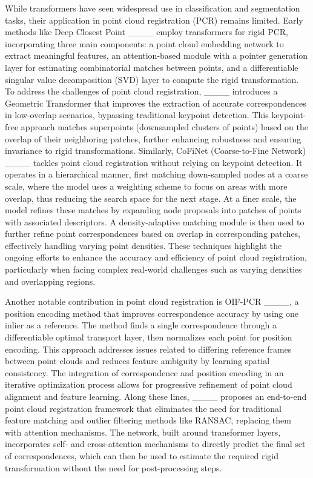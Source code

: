 While transformers have seen widespread use in classification and segmentation tasks, their application in point cloud registration (PCR) remains limited. Early methods like Deep Closest Point ____ employ transformers for rigid PCR, incorporating three main components: a point cloud embedding network to extract meaningful features, an attention-based module with a pointer generation layer for estimating combinatorial matches between points, and a differentiable singular value decomposition (SVD) layer to compute the rigid transformation. To address the challenges of point cloud registration, ____ introduces a Geometric Transformer that improves the extraction of accurate correspondences in low-overlap scenarios, bypassing traditional keypoint detection. This keypoint-free approach matches superpoints (downsampled clusters of points) based on the overlap of their neighboring patches, further enhancing robustness and ensuring invariance to rigid transformations. Similarly, CoFiNet (Coarse-to-Fine Network) ____ tackles point cloud registration without relying on keypoint detection. It operates in a hierarchical manner, first matching down-sampled nodes at a coarse scale, where the model uses a weighting scheme to focus on areas with more overlap, thus reducing the search space for the next stage. At a finer scale, the model refines these matches by expanding node proposals into patches of points with associated descriptors. A density-adaptive matching module is then used to further refine point correspondences based on overlap in corresponding patches, effectively handling varying point densities. These techniques highlight the ongoing efforts to enhance the accuracy and efficiency of point cloud registration, particularly when facing complex real-world challenges such as varying densities and overlapping regions.

Another notable contribution in point cloud registration is OIF-PCR ____, a position encoding method that improves correspondence accuracy by using one inlier as a reference. The method finds a single correspondence through a differentiable optimal transport layer, then normalizes each point for position encoding. This approach addresses issues related to differing reference frames between point clouds and reduces feature ambiguity by learning spatial consistency. The integration of correspondence and position encoding in an iterative optimization process allows for progressive refinement of point cloud alignment and feature learning. Along these lines, ____ proposes an end-to-end point cloud registration framework that eliminates the need for traditional feature matching and outlier filtering methods like RANSAC, replacing them with attention mechanisms. The network, built around transformer layers, incorporates self- and cross-attention mechanisms to directly predict the final set of correspondences, which can then be used to estimate the required rigid transformation without the need for post-processing steps.

